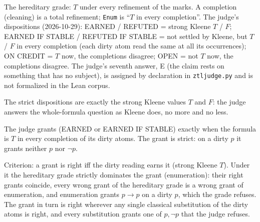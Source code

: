 \begin{definition}\label{def:grades}
  \leanok
  The hereditary grade: $T$ under every refinement of the marks. A
  completion (cleaning) is a total refinement; \texttt{Enum} is ``$T$ in
  every completion''. The judge's dispositions (2026-10-29):
  EARNED / REFUTED = strong Kleene $T$ / $F$;
  EARNED IF STABLE / REFUTED IF STABLE = not settled by Kleene, but $T$ / $F$
  in every completion (each dirty atom read the same at all its
  occurrences);
  ON CREDIT = $T$ now, the completions disagree;
  OPEN = not $T$ now, the completions disagree.
  The judge's seventh answer, E (the claim rests on something that has no
  subject), is assigned by declaration in \texttt{ztljudge.py} and is not
  formalized in the Lean corpus.
\end{definition}

\begin{theorem}\label{thm:strictkleene}
  \leanok
  The strict dispositions are exactly the strong Kleene values $T$ and $F$:
  the judge answers the whole-formula question as Kleene does, no more and no
  less.
\end{theorem}

\begin{theorem}\label{thm:grant}
  \leanok
  The judge grants (EARNED or EARNED IF STABLE) exactly when the formula is
  $T$ in every completion of its dirty atoms. The grant is strict: on a dirty
  $p$ it grants neither $p$ nor $\neg p$.
\end{theorem}

\begin{theorem}[Dominance]\label{thm:dominance}
  \leanok
  Criterion: a grant is right iff the dirty reading earns it (strong Kleene
  $T$). Under it the hereditary grade strictly dominates the grant
  (enumeration): their right grants coincide, every wrong grant of the
  hereditary grade is a wrong grant of enumeration, and enumeration grants
  $p\to p$ on a dirty $p$, which the grade refuses. The grant in turn is right
  wherever any single classical substitution of the dirty atoms is right, and
  every substitution grants one of $p,\neg p$ that the judge refuses.
\end{theorem}

